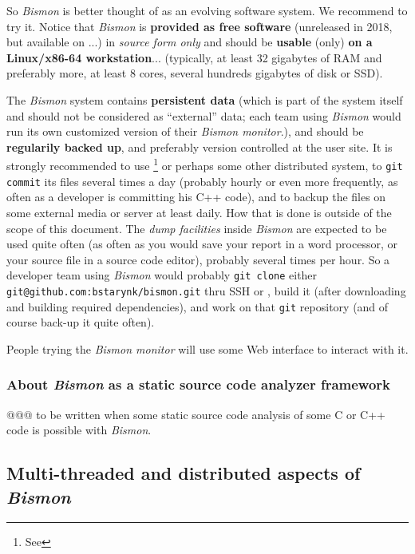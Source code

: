So \emph{Bismon} is better thought of as an evolving software
system. We recommend to try it. Notice that \textit{Bismon} is
\textbf{provided as free software} (unreleased in 2018, but available
on  ...) in \emph{source form only}
and should be \textbf{usable} (only) \textbf{on a Linux/x86-64
  workstation}... (typically, at least 32 gigabytes of RAM and
preferably more, at least 8 cores, several hundreds gigabytes of disk
or SSD).

The \textit{Bismon} system contains \textbf{persistent data} (which is
part of the system itself and should not be considered as ``external''
data; each team using \textit{Bismon} would run its own customized
version of their \textit{Bismon monitor}.), and should be
\textbf{regularily backed up}, and preferably version controlled at
the user site. It is strongly recommended to use
 \footnote{See }
or perhaps some other distributed  system, to \texttt{git commit} its files several times a
day (probably hourly or even more frequently, as often as a developer
is committing his C++ code), and to backup the files on some external
media or server at least daily. How that is done is outside of the
scope of this document. The \emph{dump facilities} inside
\textit{Bismon} are expected to be used quite often (as often as you
would save your report in a word processor, or your source file in a
source code editor), probably several times per hour. So a developer
team using \textit{Bismon} would probably \texttt{git clone} either
\texttt{git@github.com:bstarynk/bismon.git} thru SSH or
, build it (after
downloading and building required dependencies), and work on that
\texttt{git} repository (and of course back-up it quite often).

People trying the \emph{Bismon monitor} will use some Web interface to
interact with it.

\subsubsection{About \emph{Bismon} as a static source code analyzer framework}

@@@ to be written when some static source code analysis of some C or
C++ code is possible with \emph{Bismon}.


\subsection{Multi-threaded and distributed aspects of \textit{Bismon}}

